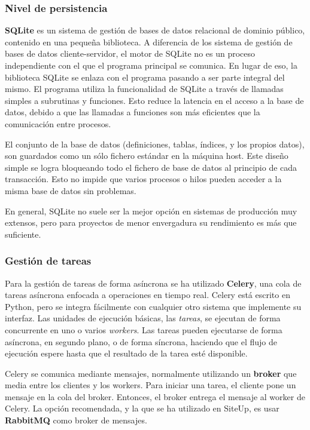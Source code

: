 \subsubsection{Nivel de persistencia}

\textbf{SQLite} es un sistema de gestión de bases de datos relacional de dominio público,
contenido en una pequeña biblioteca. A diferencia de los sistema de gestión de
bases de datos cliente-servidor, el motor de SQLite no es un proceso
independiente con el que el programa principal se comunica. En lugar de eso, la
biblioteca SQLite se enlaza con el programa pasando a ser parte integral del
mismo. El programa utiliza la funcionalidad de SQLite a través de llamadas
simples a subrutinas y funciones. Esto reduce la latencia en el acceso a la base
de datos, debido a que las llamadas a funciones son más eficientes que la
comunicación entre procesos. 

El conjunto de la base de datos (definiciones, tablas, índices, y los propios
datos), son guardados como un sólo fichero estándar en la máquina host. Este
diseño simple se logra bloqueando todo el fichero de base de datos al principio
de cada transacción. Esto no impide que varios procesos o hilos pueden acceder a
la misma base de datos sin problemas.

En general, SQLite no suele ser la mejor opción en sistemas de producción muy
extensos, pero para proyectos de menor envergadura su rendimiento es más que
suficiente.

\subsubsection{Gestión de tareas}

Para la gestión de tareas de forma asíncrona se ha utilizado \textbf{Celery},
una cola de tareas asíncrona enfocada a operaciones en tiempo real. Celery está
escrito en Python, pero se integra fácilmente con cualquier otro sistema que
implemente su interfaz. Las unidades de ejecución básicas, las \textit{tareas},
se ejecutan de forma concurrente en uno o varios \textit{workers}. Las tareas
pueden ejecutarse de forma asíncrona, en segundo plano, o de forma síncrona,
haciendo que el flujo de ejecución espere hasta que el resultado de la tarea
esté disponible.

Celery se comunica mediante mensajes, normalmente utilizando un \textbf{broker}
que media entre los clientes y los workers. Para iniciar una tarea, el cliente
pone un mensaje en la cola del broker. Entonces, el broker entrega el mensaje al
worker de Celery. La opción recomendada, y la que se ha utilizado en SiteUp, es
usar \textbf{RabbitMQ} como broker de mensajes.

